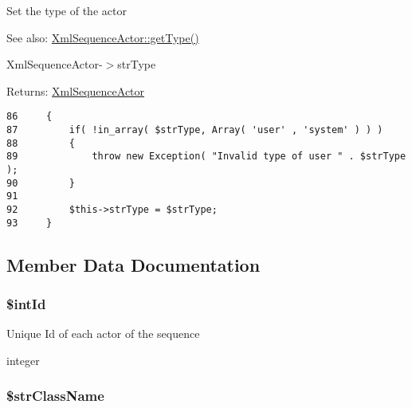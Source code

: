 Set the type of the actor

\begin{Desc}
\item[See also:]\hyperlink{class_xml_sequence_actor_830b5c75df72b32396701bc563fbe3c7}{XmlSequenceActor::getType()} 

XmlSequenceActor-$>$strType \end{Desc}
\begin{Desc}
\item[Returns:]\hyperlink{class_xml_sequence_actor}{XmlSequenceActor} \end{Desc}


\begin{Code}\begin{verbatim}86     {
87         if( !in_array( $strType, Array( 'user' , 'system' ) ) )
88         {
89             throw new Exception( "Invalid type of user " . $strType );
90         }
91 
92         $this->strType = $strType;
93     }
\end{verbatim}
\end{Code}




\subsection{Member Data Documentation}
\hypertarget{class_xml_sequence_actor_a53d60bfd4dfc5b04cd34ac011b617aa}{
\subsubsection[{\$intId}]{\setlength{\rightskip}{0pt plus 5cm}\$intId}}
\label{class_xml_sequence_actor_a53d60bfd4dfc5b04cd34ac011b617aa}


Unique Id of each actor of the sequence

integer \hypertarget{class_xml_sequence_actor_35e72db77496f4544796187dbac02904}{
\subsubsection[{\$strClassName}]{\setlength{\rightskip}{0pt plus 5cm}\$strClassName}}
\label{class_xml_sequence_actor_35e72db77496f4544796187dbac02904}


